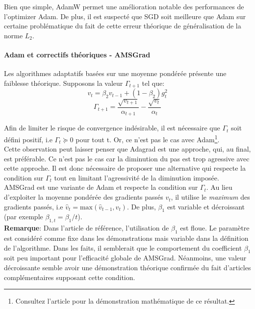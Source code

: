 \noindent Bien que simple, AdamW permet une amélioration notable des performances de l'optimizer Adam. De plus, il est suspecté que SGD soit meilleure que Adam sur certaine problématique du fait de cette erreur théorique de généralisation de la norme $L_2$.

\paragraph{Adam et correctifs théoriques - AMSGrad}

\noindent Les algorithmes adaptatifs basées sur une moyenne pondérée présente une faiblesse théorique. Supposons la valeur $\Gamma_{t+1}$ tel que:
$$v_t = \beta_2 v_{t-1} + (1 - \beta_2) g_t^2$$
$$\Gamma_{t+1}=\frac{\sqrt{v_{t+1}}}{\alpha_{t+1}}-\frac{\sqrt{v_{t}}}{\alpha_{t}}$$

\noindent Afin de limiter le risque de convergence indésirable, il est nécessaire que $\Gamma_t$ soit défini positif, i.e $\Gamma_t \succeq 0$ pour tout t. Or, ce n'est pas le cas avec Adam\footnote{Consultez l'article \cite{amsgrad} pour la démonstration mathématique de ce résultat.}.\\

\noindent Cette observation peut laisser penser que Adagrad est une approche, qui, au final, est préférable. Ce n'est pas le cas car la diminution du pas est trop agressive avec cette approche. Il est donc nécessaire de proposer une alternative qui respecte la condition sur $\Gamma_t$ tout en limitant l'agressivité de la diminution imposée.\\

\noindent AMSGrad\cite{amsgrad} est une variante de Adam et respecte la condition sur $\Gamma_t$. Au lieu d'exploiter la moyenne pondérée des gradients passés $v_t$, il utilise le \textit{maximum} des gradients passés, i.e $\hat{v}_t = \text{max}(\hat{v}_{t-1}, v_t)$. De plus, $\beta_1$ est variable et décroissant (par exemple $\beta_{1,t}=\beta_1/t$).\\

\noindent \textbf{Remarque}: Dans l'article de référence, l'utilisation de $\beta_1$ est floue. Le paramètre est considéré comme fixe dans les démonstrations mais variable dans la définition de l'algorithme. Dans les faits, il semblerait que le comportement du coefficient $\beta_1$ soit peu important pour l'efficacité globale de AMSGrad. Néanmoins, une valeur décroissante semble avoir une démonstration théorique confirmée du fait d'articles complémentaires supposant cette condition.\\

